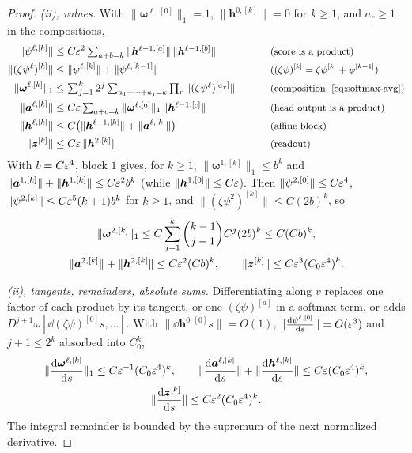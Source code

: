 \begin{proof}
\emph{(ii), values.} With $\|\bm\omega^{\ell,[0]}\|_1=1$, $\|\bm h^{0,[k]}\|=0$ for $k\ge1$, and $a_r\ge1$ in the compositions,
\begin{alignat*}{2}
 \|\psi^{\ell,[k]}\|&\le C\initscale^2\textstyle\sum_{a+b=k}\|\bm h^{\ell-1,[a]}\|\,\|\bm h^{\ell-1,[b]}\| &\qquad& \why{score is a product}\\
 \|(\zeta\psi^\ell)^{[k]}\|&\le\|\psi^{\ell,[k]}\|+\|\psi^{\ell,[k-1]}\| && \why{$(\zeta\psi)^{[k]}=\zeta\psi^{[k]}+\psi^{[k-1]}$}\\
 \|\bm\omega^{\ell,[k]}\|_1&\le\textstyle\sum_{j=1}^k2^j\sum_{a_1+\cdots+a_j=k}\prod_r\|(\zeta\psi^\ell)^{[a_r]}\| && \why{composition, \cref{eq:softmax-avg}}\\
 \|\bm a^{\ell,[k]}\|&\le C\initscale\textstyle\sum_{a+c=k}\|\bm\omega^{\ell,[a]}\|_1\,\|\bm h^{\ell-1,[c]}\| && \why{head output is a product}\\
 \|\bm h^{\ell,[k]}\|&\le C\bigl(\|\bm h^{\ell-1,[k]}\|+\|\bm a^{\ell,[k]}\|\bigr) && \why{affine block}\\
 \|\bm z^{[k]}\|&\le C\initscale\,\|\bm h^{2,[k]}\| && \why{readout}
\end{alignat*}
With $b=C\varepsilon^4$, block $1$ gives, for $k\ge1$, $\|\bm\omega^{1,[k]}\|_1\le b^k$ and $\|\bm a^{1,[k]}\|+\|\bm h^{1,[k]}\|\le C\varepsilon^2b^k$ (while $\|\bm h^{1,[0]}\|\le C\varepsilon$). Then $\|\psi^{2,[0]}\|\le C\varepsilon^4$,
$\|\psi^{2,[k]}\|\le C\varepsilon^5(k+1)b^k$ for $k\ge1$, and $\|(\zeta\psi^2)^{[k]}\|\le C(2b)^k$, so
\begin{gather*}
 \|\bm\omega^{2,[k]}\|_1\le C\sum_{j=1}^k\binom{k-1}{j-1}C^j(2b)^k\le C(Cb)^k,\\
 \|\bm a^{2,[k]}\|+\|\bm h^{2,[k]}\|\le C\varepsilon^2(Cb)^k,\qquad \|\bm z^{[k]}\|\le C\varepsilon^3(C_0\varepsilon^4)^k .
\end{gather*}

\emph{(ii), tangents, remainders, absolute sums.} Differentiating along $v$ replaces one factor of each product by its tangent, or one
$(\zeta\psi)^{[a]}$ in a softmax term, or adds $D^{j+1}\omega[\dd{(\zeta\psi)^{[0]}}{s},\ldots]$. With $\|\dd{\bm h^{0,[0]}}{s}\|=O(1)$, $\|\dd{\psi^{\ell,[0]}}{s}\|=O(\initscale^3)$
and $j+1\le2^k$ absorbed into $C_0^k$,
\begin{gather*}
 \|\dd{\bm\omega^{\ell,[k]}}{s}\|_1\le C\initscale^{-1}(C_0\initscale^4)^k,\qquad \|\dd{\bm a^{\ell,[k]}}{s}\|+\|\dd{\bm h^{\ell,[k]}}{s}\|\le C\initscale(C_0\initscale^4)^k,\\
 \|\dd{\bm z^{[k]}}{s}\|\le C\initscale^2(C_0\initscale^4)^k .
\end{gather*}
The integral remainder is bounded by the supremum of the next normalized derivative.


\end{proof}
